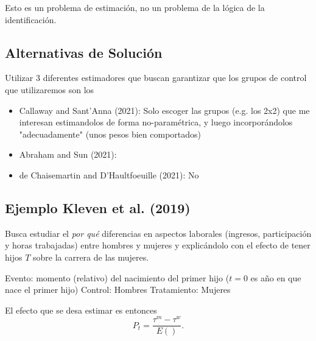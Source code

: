 \documentclass[11pt, twocolumn]{article}
\begin{document}
Esto es un problema de estimación, no un problema de la lógica de la identificación.
\subsection{Alternativas de Solución}
Utilizar 3 diferentes estimadores que buscan garantizar que los grupos de control que utilizaremos son los 
\begin{itemize}
    \item Callaway and Sant'Anna (2021): Solo escoger las grupos (e.g. los 2x2) que me interesan estimandolos de forma no-paramétrica, y luego incorporándolos "adecuadamente" (unos pesos bien comportados)
    \item Abraham and Sun (2021): 
    \item de Chaisemartin and D'Haultfoeuille (2021): No 
        
\end{itemize}

\subsection{Ejemplo Kleven et al. (2019)}
Busca estudiar el \textit{por qué} diferencias en aspectos laborales (ingresos, participación y horas trabajadas) entre hombres y mujeres y explicándolo con el efecto de tener hijos $T$ sobre la carrera de las mujeres.

Evento: momento (relativo) del nacimiento del primer hijo ($t=0$ es año en que nace el primer hijo)
Control: Hombres
Tratamiento: Mujeres

El efecto que se desa estimar es entonces
\[
    P_t=\frac{\tau^m-\tau^w}{E()}
.\] 
\end{document}
